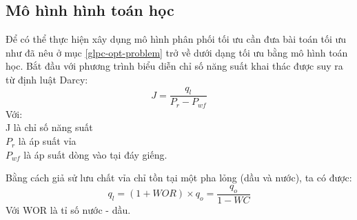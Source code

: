\documentclass[12pt,a4paper]{report}
\begin{document}
\subsection{Mô hình hình toán học}
Để có thể thực hiện xây dụng mô hình phân phối tối ưu cần đưa bài toán tối ưu như đã nêu ở mục \ref{glpc-opt-problem} trở về dưới dạng tối ưu bằng mô hình toán học. Bắt đầu với phương trình biểu diễn chỉ số năng suất khai thác được suy ra từ định luật Darcy:
	\begin{equation}\label{eqn:darcy-productivity-index}
		J = \dfrac{q_l}{P_r - P_{wf}}
	\end{equation}
Với:\\
\hspace*{1cm}J là chỉ số năng suất\\
\hspace*{1cm}$P_r$ là áp suất vỉa\\
\hspace*{1cm}$P_{wf}$ là áp suất dòng vào tại đáy giếng.

Bằng cách giả sử lưu chất vỉa chỉ tồn tại một pha lỏng (dầu và nước), ta có được:
	\begin{equation}\label{eqn:qo-ql-wc}
		q_l = (1 + WOR) \times q_o = \dfrac{q_o}{1 - WC}
	\end{equation}
Với WOR là tỉ số nước - dầu.
\end{document}

